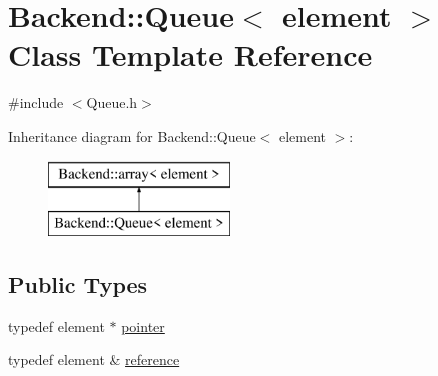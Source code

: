 \hypertarget{classBackend_1_1Queue}{\section{Backend\+:\+:Queue$<$ element $>$ Class Template Reference}
\label{classBackend_1_1Queue}
}


{\ttfamily \#include $<$Queue.\+h$>$}

Inheritance diagram for Backend\+:\+:Queue$<$ element $>$\+:\begin{figure}[H]
\begin{center}
\leavevmode
\includegraphics[height=2.000000cm]{classBackend_1_1Queue}
\end{center}
\end{figure}
\subsection*{Public Types}
\begin{DoxyCompactItemize}
\item 
typedef element $\ast$ \hyperlink{classBackend_1_1array_a6d8785dc8b979153ef122f4e3bad1408}{pointer}
\item 
typedef element \& \hyperlink{classBackend_1_1array_aa98075b8d7a4e63ea919ee9d1d4df4a9}{reference}
\end{DoxyCompactItemize}
